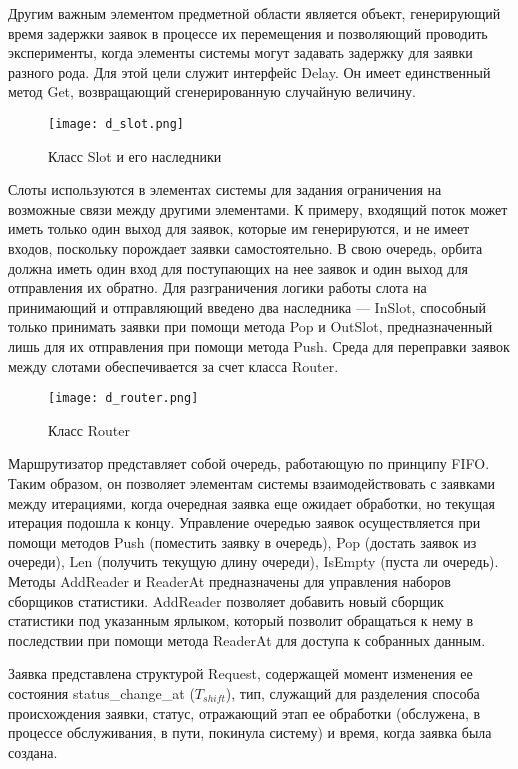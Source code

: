 Другим важным элементом предметной области является объект, генерирующий время задержки заявок в процессе их перемещения и позволяющий проводить эксперименты, когда элементы системы могут задавать задержку для заявки разного рода. Для этой цели служит интерфейс Delay. Он имеет единственный метод Get, возвращающий сгенерированную случайную величину.
\begin{figure}[H]
	\centering
	\texttt{[image: d\_slot.png]}
	\caption{Класс Slot и его наследники}
	\label{d_slot}
\end{figure}

Слоты используются в элементах системы для задания ограничения на возможные связи между другими элементами. К примеру, входящий поток может иметь только один выход для заявок, которые им генерируются, и не имеет входов, поскольку порождает заявки самостоятельно. В свою очередь, орбита должна иметь один вход для поступающих на нее заявок и один выход для отправления их обратно. Для разграничения логики работы слота на принимающий и отправляющий введено два наследника --- InSlot, способный только принимать заявки при помощи метода Pop и OutSlot, предназначенный лишь для их отправления при помощи метода Push. Среда для переправки заявок между слотами обеспечивается за счет класса Router.

\begin{figure}[H]
	\centering
	\texttt{[image: d\_router.png]}
	\caption{Класс Router}
	\label{d_router}
\end{figure}
Маршрутизатор представляет собой очередь, работающую по принципу FIFO. Таким образом, он позволяет элементам системы взаимодействовать с заявками между итерациями, когда очередная заявка еще ожидает обработки, но текущая итерация подошла к концу. Управление очередью заявок осуществляется при помощи методов Push (поместить заявку в очередь), Pop (достать заявок из очереди), Len (получить текущую длину очереди), IsEmpty (пуста ли очередь). Методы AddReader и ReaderAt предназначены для управления наборов сборщиков статистики. AddReader позволяет добавить новый сборщик статистики под указанным ярлыком, который позволит обращаться к нему в последствии при помощи метода ReaderAt для доступа к собранных данным.

Заявка представлена структурой Request, содержащей момент изменения ее состояния status\_change\_at ($T_{shift}$), тип, служащий для разделения способа происхождения заявки, статус, отражающий этап ее обработки (обслужена, в процессе обслуживания, в пути, покинула систему) и время, когда заявка была создана.


